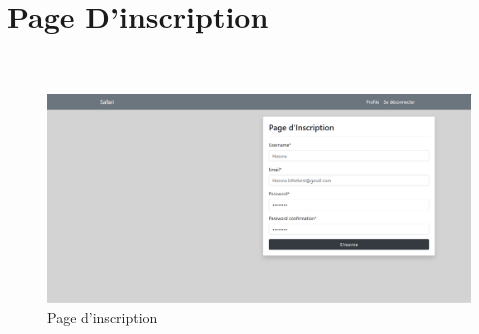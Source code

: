 \begin{enumerate}
  \paragraph{\\}
  
    \paragraph{\\}
  
\section{Page D’inscription}

\renewcommand{\thefigure}{8}
  \paragraph{\\}
\begin{center}
    \begin{figure}[htbp]
        \centering
        \includegraphics[width=1\linewidth, height=0.65\textheight]{images/inscription_second.png} 
        \caption{Page d'inscription}
        \label{fig:Page d'inscription}
    \end{figure}
\end{center}
 
  
  
  \paragraph{\\}
  
    \paragraph{\\}
  

\end{enumerate}
